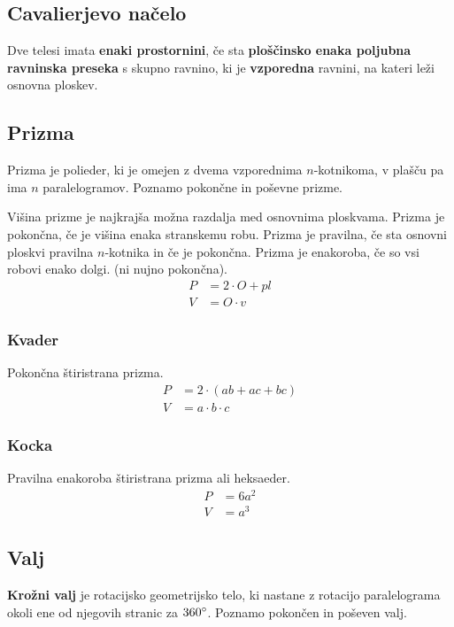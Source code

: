\documentclass[a4paper,oneside,12pt,fleqn]{article}
\newcommand\krat\cdot
\def\deg{\degree}
\numberwithin{equation}{section}
\begin{document}
\subsection{Cavalierjevo načelo}
\label{sec:tel:cavalieri}
Dve telesi imata \textbf{enaki prostornini}, če sta \textbf{ploščinsko enaka poljubna ravninska preseka} s
skupno ravnino, ki je \textbf{vzporedna} ravnini, na kateri leži osnovna ploskev.

\subsection{Prizma}
\label{sec:tel:priz}
Prizma je polieder, ki je omejen z dvema vzporednima $n$-kotnikoma, v plašču pa ima $n$
paralelogramov. Poznamo pokončne in poševne prizme.

Višina prizme je najkrajša možna razdalja med osnovnima ploskvama.
Prizma je pokončna, če je višina enaka stranskemu robu. Prizma je pravilna, če sta osnovni
ploskvi pravilna $n$-kotnika in če je pokončna. Prizma je enakoroba, če so vsi robovi
enako dolgi. (ni nujno pokončna).
\begin{align*}
  P &= 2 \krat O + pl \\
  V &= O \krat v 
\end{align*}

\parbox[t]{0.5\textwidth}{
\subsubsection{Kvader}
\label{sec:tel:priz:kvad}
Pokončna štiristrana prizma.
\begin{align*}
  P &= 2\krat (ab+ac+bc) \\
  V &= a\krat b\krat c
\end{align*}
}\parbox[t]{0.5\textwidth}{
\subsubsection{Kocka}
\label{sec:tel:priz:koc}
Pravilna enakoroba štiristrana prizma ali heksaeder.
\begin{align*}
    P &= 6a^2 \\
    V &= a^3
\end{align*}
}

\subsection{Valj}
\label{sec:tel:valj}
\textbf{Krožni valj} je rotacijsko geometrijsko telo, ki nastane z rotacijo paralelograma okoli ene
od njegovih stranic za $360\deg$. Poznamo pokončen in poševen valj.
\end{document}

